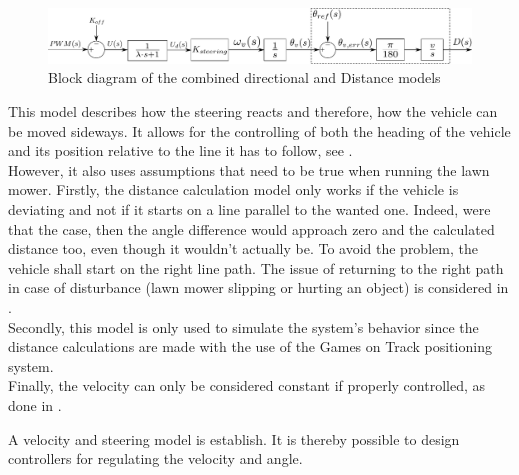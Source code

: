 \begin{figure}[H]
  \centering
  \includegraphics[width=1.1\textwidth]{figures/steeringModelWithLineFollowing.pdf}
  \caption{Block diagram of the combined directional and Distance models}
  \label{fig:steeringLineFollowingModel}
\end{figure}

This model describes how the steering reacts and therefore, how the vehicle can be moved sideways. It allows for the controlling of both the heading of the vehicle and its position relative to the line it has to follow, see .\\
However, it also uses assumptions that need to be true when running the lawn mower. Firstly, the distance calculation model only works if the vehicle is deviating and not if it starts on a line parallel to the wanted one. Indeed, were that the case, then the angle difference would approach zero and the calculated distance too, even though it wouldn't actually be. To avoid the problem, the vehicle shall start on the right line path. The issue of returning to the right path in case of disturbance (lawn mower slipping or hurting an object) is considered in .\\
Secondly, this model is only used to simulate the system's behavior since the distance calculations are made with the use of the Games on Track positioning system.\\
Finally, the velocity can only be considered constant if properly controlled, as done in .

A velocity and steering model is establish. It is thereby possible to design controllers for regulating the velocity and angle. 